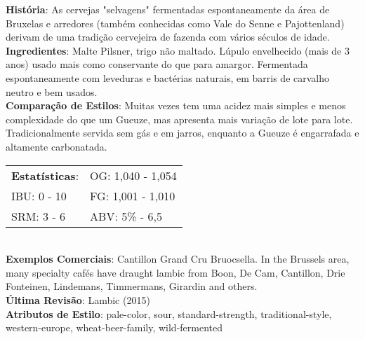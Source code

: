 \textbf{História}: As cervejas "selvagens" fermentadas espontaneamente da área de Bruxelas e arredores (também conhecidas como Vale do Senne e Pajottenland) derivam de uma tradição cervejeira de fazenda com vários séculos de idade. \\
\textbf{Ingredientes}: Malte Pilsner, trigo não maltado. Lúpulo envelhecido (mais de 3 anos) usado mais como conservante do que para amargor. Fermentada espontaneamente com leveduras e bactérias naturais, em barris de carvalho neutro e bem usados. \\
\textbf{Comparação de Estilos}: Muitas vezes tem uma acidez mais simples e menos complexidade do que um Gueuze, mas apresenta mais variação de lote para lote. Tradicionalmente servida sem gás e em jarros, enquanto a Gueuze é engarrafada e altamente carbonatada. \\
\begin{tabular}{@{}p{35mm}p{35mm}@{}}
  \textbf{Estatísticas}: & OG: 1,040 - 1,054 \\
  IBU: 0 - 10  & FG: 1,001 - 1,010  \\
  SRM: 3 - 6  & ABV: 5\% - 6,5%
\end{tabular}\\
\textbf{Exemplos Comerciais}: Cantillon Grand Cru Bruocsella. In the Brussels area, many specialty cafés have draught lambic from Boon, De Cam, Cantillon, Drie Fonteinen, Lindemans, Timmermans, Girardin and others. \\
\textbf{Última Revisão}: Lambic (2015) \\
\textbf{Atributos de Estilo}: pale-color, sour, standard-strength, traditional-style, western-europe, wheat-beer-family, wild-fermented
